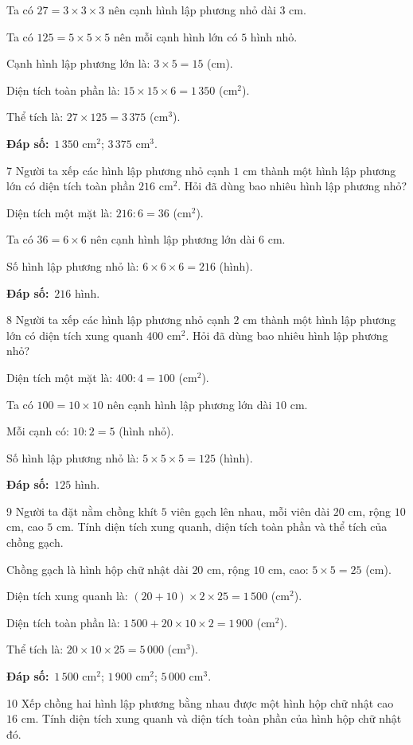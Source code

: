 \documentclass[11pt]{article}
\newif\ifsol \solfalse
\providecommand{\AnsWord}{Đáp số}
\newcommand{\dapso}[1]{\par\textbf{\AnsWord:}\ #1}
\newcommand{\probsol}[1]{%
  \begin{lrbox}{\solmeasure}\begin{minipage}{\dimexpr\linewidth-24pt\relax}#1\end{minipage}\end{lrbox}%
  \ifsol
    \begin{solbox}#1\end{solbox}%
  \else
    \setlength{\solht}{\dimexpr\ht\solmeasure+\dp\solmeasure+0.85cm\relax}%
    \ifdim\solht<1.35cm\setlength{\solht}{1.35cm}\fi
    \begin{tcolorbox}[colback=white,colframe=Line,boxrule=0.8pt,arc=5pt,
      left=8pt,right=8pt,top=4pt,bottom=4pt,height=\solht]{\footnotesize\color{Slate}\itshape\WorkWord}\end{tcolorbox}%
  \fi}
\newcommand{\gap}{\vspace{0.3cm}}
\def\WorkWord{Bài làm:}
\def\AnsWord{Đáp số}
\begin{document}
\probsol{
Ta có $27=3\times3\times3$ nên cạnh hình lập phương nhỏ dài $3$ cm.\par
Ta có $125=5\times5\times5$ nên mỗi cạnh hình lớn có $5$ hình nhỏ.\par
Cạnh hình lập phương lớn là: $3\times5=15$ (cm).\par
Diện tích toàn phần là: $15\times15\times6=1\,350$ (cm$^2$).\par
Thể tích là: $27\times125=3\,375$ (cm$^3$).
\dapso{$1\,350$ cm$^2$; $3\,375$ cm$^3$.}}
\gap
\begin{probbox}{7}{\relax}
Người ta xếp các hình lập phương nhỏ cạnh $1$ cm thành một hình lập phương lớn có diện tích toàn phần $216$ cm$^2$. Hỏi đã dùng bao nhiêu hình lập phương nhỏ?
\end{probbox}
\probsol{
Diện tích một mặt là: $216:6=36$ (cm$^2$).\par
Ta có $36=6\times6$ nên cạnh hình lập phương lớn dài $6$ cm.\par
Số hình lập phương nhỏ là: $6\times6\times6=216$ (hình).
\dapso{$216$ hình.}}
\gap
\begin{probbox}{8}{\relax}
Người ta xếp các hình lập phương nhỏ cạnh $2$ cm thành một hình lập phương lớn có diện tích xung quanh $400$ cm$^2$. Hỏi đã dùng bao nhiêu hình lập phương nhỏ?
\end{probbox}
\probsol{
Diện tích một mặt là: $400:4=100$ (cm$^2$).\par
Ta có $100=10\times10$ nên cạnh hình lập phương lớn dài $10$ cm.\par
Mỗi cạnh có: $10:2=5$ (hình nhỏ).\par
Số hình lập phương nhỏ là: $5\times5\times5=125$ (hình).
\dapso{$125$ hình.}}
\gap
\begin{probbox}{9}{\relax}
Người ta đặt nằm chồng khít $5$ viên gạch lên nhau, mỗi viên dài $20$ cm, rộng $10$ cm, cao $5$ cm. Tính diện tích xung quanh, diện tích toàn phần và thể tích của chồng gạch.
\end{probbox}
\probsol{
Chồng gạch là hình hộp chữ nhật dài $20$ cm, rộng $10$ cm, cao: $5\times5=25$ (cm).\par
Diện tích xung quanh là: $(20+10)\times2\times25=1\,500$ (cm$^2$).\par
Diện tích toàn phần là: $1\,500+20\times10\times2=1\,900$ (cm$^2$).\par
Thể tích là: $20\times10\times25=5\,000$ (cm$^3$).
\dapso{$1\,500$ cm$^2$; $1\,900$ cm$^2$; $5\,000$ cm$^3$.}}
\gap
\begin{probbox}{10}{\relax}
Xếp chồng hai hình lập phương bằng nhau được một hình hộp chữ nhật cao $16$ cm. Tính diện tích xung quanh và diện tích toàn phần của hình hộp chữ nhật đó.
\end{probbox}
\end{document}
